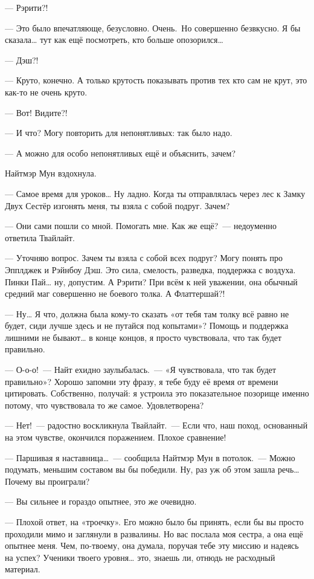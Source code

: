 \documentclass[twoside,a5paper,12pt]{extbook}
\begin{document}
— Рэрити?!

— Это было впечатляюще, безусловно. Очень. Но совершенно безвкусно. Я бы сказала… тут как ещё посмотреть, кто больше опозорился…

— Дэш?!

— Круто, конечно. А только крутость показывать против тех кто сам не крут, это как-то не очень круто.

— Вот! Видите?!

— И что? Могу повторить для непонятливых: так было надо.

— А можно для особо непонятливых ещё и объяснить, зачем?

Найтмэр Мун вздохнула.

— Самое время для уроков… Ну ладно. Когда ты отправлялась через лес к Замку Двух Сестёр изгонять меня, ты взяла с собой подруг. Зачем?

— Они сами пошли со мной. Помогать мне. Как же ещё? — недоуменно ответила Твайлайт.

— Уточняю вопрос. Зачем ты взяла с собой всех подруг? Могу понять про Эпплджек и Рэйнбоу Дэш. Это сила, смелость, разведка, поддержка с воздуха. Пинки Пай… ну, допустим. А Рэрити? При всём к ней уважении, она обычный средний маг совершенно не боевого толка. А Флаттершай?!

— Ну… Я что, должна была кому-то сказать «от тебя там толку всё равно не будет, сиди лучше здесь и не путайся под копытами»? Помощь и поддержка лишними не бывают… в конце концов, я просто чувствовала, что так будет правильно.

— О-о-о! — Найт ехидно заулыбалась. — «Я чувствовала, что так будет правильно»? Хорошо запомни эту фразу, я тебе буду её время от времени цитировать. Собственно, получай: я устроила это показательное позорище именно потому, что чувствовала то же самое. Удовлетворена?

 — Нет! — радостно воскликнула Твайлайт. — Если что, наш поход, основанный на этом чувстве, окончился поражением. Плохое сравнение!
 
 — Паршивая я наставница… — сообщила Найтмэр Мун в потолок. — Можно подумать, меньшим составом вы бы победили. Ну, раз уж об этом зашла речь… Почему вы проиграли?
 
 — Вы сильнее и гораздо опытнее, это же очевидно.
 
 — Плохой ответ, на «троечку». Его можно было бы принять, если бы вы просто проходили мимо и заглянули в развалины. Но вас послала моя сестра, а она ещё опытнее меня. Чем, по-твоему, она думала, поручая тебе эту миссию и надеясь на успех? Ученики твоего уровня… это, знаешь ли, отнюдь не расходный материал.
 
\end{document}
